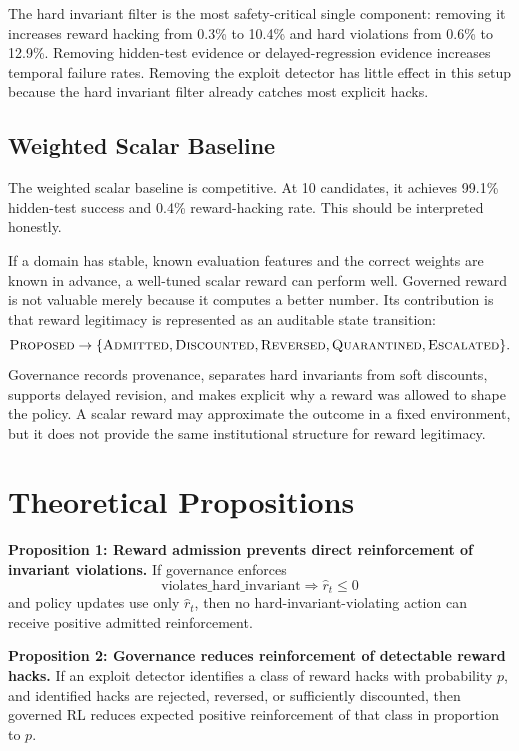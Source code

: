 \documentclass[11pt]{article}
\newcommand{\rhat}{\hat r}
\begin{document}
The hard invariant filter is the most safety-critical single component: removing it increases reward hacking from 0.3\% to 10.4\% and hard violations from 0.6\% to 12.9\%. Removing hidden-test evidence or delayed-regression evidence increases temporal failure rates. Removing the exploit detector has little effect in this setup because the hard invariant filter already catches most explicit hacks.

\subsection{Weighted Scalar Baseline}

The weighted scalar baseline is competitive. At 10 candidates, it achieves 99.1\% hidden-test success and 0.4\% reward-hacking rate. This should be interpreted honestly.

If a domain has stable, known evaluation features and the correct weights are known in advance, a well-tuned scalar reward can perform well. Governed reward is not valuable merely because it computes a better number. Its contribution is that reward legitimacy is represented as an auditable state transition:
\[
\textsc{Proposed} \rightarrow \{\textsc{Admitted},\textsc{Discounted},\textsc{Reversed},\textsc{Quarantined},\textsc{Escalated}\}.
\]
Governance records provenance, separates hard invariants from soft discounts, supports delayed revision, and makes explicit why a reward was allowed to shape the policy. A scalar reward may approximate the outcome in a fixed environment, but it does not provide the same institutional structure for reward legitimacy.

\section{Theoretical Propositions}

\textbf{Proposition 1: Reward admission prevents direct reinforcement of invariant violations.}
If governance enforces
\[
\text{violates\_hard\_invariant} \Rightarrow \rhat_t \le 0
\]
and policy updates use only $\rhat_t$, then no hard-invariant-violating action can receive positive admitted reinforcement.

\textbf{Proposition 2: Governance reduces reinforcement of detectable reward hacks.}
If an exploit detector identifies a class of reward hacks with probability $p$, and identified hacks are rejected, reversed, or sufficiently discounted, then governed RL reduces expected positive reinforcement of that class in proportion to $p$.
\end{document}
